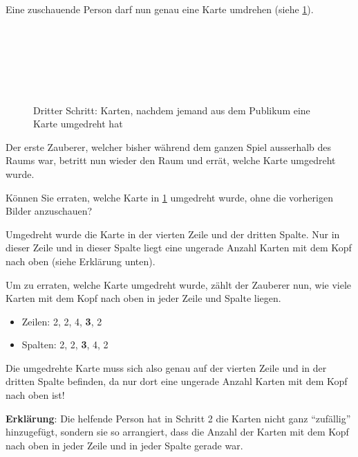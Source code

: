 Eine zuschauende Person darf nun genau eine Karte umdrehen (siehe \cref{fig:zauberer-3}).
\begin{figure}[H]
    \centering
    \\
    \\
    \\
    \\
    \\
    \caption{Dritter Schritt: Karten, nachdem jemand aus dem Publikum eine Karte umgedreht hat}
    \label{fig:zauberer-3}
\end{figure}
Der erste Zauberer, welcher bisher während dem ganzen Spiel ausserhalb des Raums war, betritt nun wieder den Raum und errät, welche Karte umgedreht wurde.

\begin{mychallenge}
    Können Sie erraten, welche Karte in \cref{fig:zauberer-3} umgedreht wurde, ohne die vorherigen Bilder anzuschauen?
    \begin{myanswer}
        Umgedreht wurde die Karte in der vierten Zeile und der dritten Spalte. Nur in dieser Zeile und in dieser Spalte liegt eine ungerade Anzahl Karten mit dem Kopf nach oben (siehe Erklärung unten).
    \end{myanswer}
\end{mychallenge}

Um zu erraten, welche Karte umgedreht wurde, zählt der Zauberer nun, wie viele Karten mit dem Kopf nach oben in jeder Zeile und Spalte liegen.
\begin{itemize}
    \item Zeilen: 2, 2, 4, \textbf{3}, 2
    \item Spalten: 2, 2, \textbf{3}, 4, 2
\end{itemize}

Die umgedrehte Karte muss sich also genau auf der vierten Zeile und in der dritten Spalte befinden, da nur dort eine ungerade Anzahl Karten mit dem Kopf nach oben ist!

\textbf{Erklärung}: Die helfende Person hat in Schritt 2 die Karten nicht ganz \enquote{zufällig} hinzugefügt, sondern sie so arrangiert, dass die Anzahl der Karten mit dem Kopf nach oben in jeder Zeile und in jeder Spalte gerade war.

